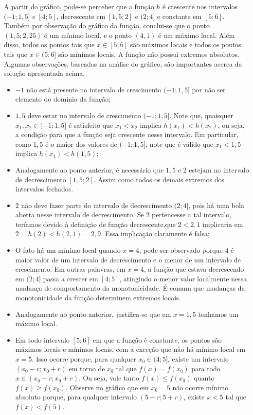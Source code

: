 \begin{solution}
    A partir do gráfico, pode-se perceber que a função $h$ é crescente nos intervalos $(-1;1{,}5]$ e $[4;5]$,
    decrescente em $[1,5; 2]$ e $(2;4]$ e constante em $[5;6]$.     
    Também por observação do gráfico da função, conclui-se que o ponto $(1{,}5; 2{,}25)$ é um mínimo local, e o ponto $(4,1)$ é um máximo local. Além disso, todos os pontos tais que $x \in [5;6]$ são máximos locais e todos os pontos tais que $x \in (5; 6]$ são mínimos locais.
    A função não possui extremos absolutos.
    Algumas observações, baseadas na análise do gráfico, são importantes acerca da solução apresentada acima.
    \begin{itemize}
        \item $-1$ não está presente no intervalo de crescimento $(-1;1{,}5]$ por não ser elemento do domínio da função;
        \item $1{,}5$ deve estar no intervalo de crescimento $(-1;1{,}5]$. Note que, quaisquer $x_1, x_2 \in (-1;1{,}5]$ é satisfeito que $x_1 < x_2$ implica $h(x_1) < h(x_2)$, ou seja, a condição para que a função seja crescente nesse intervalo. Em particular, como $1{,}5$ é o maior dos valores de $(-1;1{,}5]$, note que é válido que $x_1 < 1{,}5$ implica $h(x_1) < h(1{,}5)$;
        \item Analogamente ao ponto anterior, é necessário que $1{,}5$ e $2$ estejam no intervalo de decrescimento $[1,5; 2]$. Assim como todos os demais extremos dos intervalos fechados.
        \item $2$ não deve fazer parte do intervalo de decrescimento $(2; 4]$, pois há uma bola aberta nesse intervalo de decrescimento. Se $2$ pertencesse a tal intervalo, teríamos devido à definição de função decrescente,que $2<2{,}1$ implicaria em $2 = h(2) < h(2{,}1) = 2{,}9$. Essa implicação claramente é falsa;
        \item O fato há um mínimo local quando $x = 4$, pode ser observado porque $4$ é maior valor de um intervalo de decrescimento e o menor de um intervalo de crescimento. Em outras palavras, em $x=4$, a função que estava decrescendo em $(2;4]$ passa a crescer em $[4;5]$, atingindo o menor valor localmente nessa mudança de comportamento da monotonicidade. É comum que mudanças da monotonicidade da função determinem extremos locais.
        \item Analogamente ao ponto anterior, justifica-se que em $x=1{,}5$ tenhamos um máximo local.
        \item Em todo intervalo $[5; 6]$ em que a função é constante, os pontos são máximos locais e mínimos locais, com  a exceção que não há mínimo local em $x=5$. Isso ocorre porque, para qualquer $x_0\in (4;5]$, existe um intervalo $(x_0 - r; x_0+r)$ em torno de $x_0$ tal que $f(x)= f(x_0)$ para todo $x \in (x_0 - r; x_0+r)$. Ou seja, vale tanto $f(x) \leq f(x_0)$ quanto $f(x)\geq f(x_0)$. Observe no gráfico que em $x_0= 5$ não ocorre mínimo absoluto porque, para qualquer intervalo $(5 - r; 5+r)$, existe $x < 5$ tal que $f(x) < f(5)$.

\end{itemize}
\end{solution}
